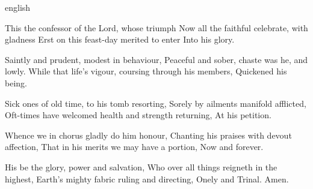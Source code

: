 {english}
{This the confessor of the Lord, whose triumph
Now all the faithful celebrate, with gladness
Erst on this feast-day merited to enter
Into his glory.

Saintly and prudent, modest in behaviour,
Peaceful and sober, chaste was he, and lowly.
While that life’s vigour, coursing through his members,
Quickened his being.

Sick ones of old time, to his tomb resorting,
Sorely by ailments manifold afflicted,
Oft-times have welcomed health and strength returning,
At his petition.

Whence we in chorus gladly do him honour,
Chanting his praises with devout affection,
That in his merits we may have a portion,
Now and forever.

His be the glory, power and salvation,
Who over all things reigneth in the highest,
Earth’s mighty fabric ruling and directing,
Onely and Trinal.
Amen.}